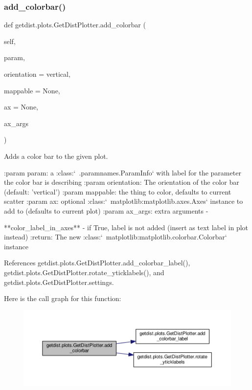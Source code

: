 \subsubsection{\texorpdfstring{add\+\_\+colorbar()}{add\_colorbar()}}
{\footnotesize\ttfamily def getdist.\+plots.\+Get\+Dist\+Plotter.\+add\+\_\+colorbar (\begin{DoxyParamCaption}\item[{}]{self,  }\item[{}]{param,  }\item[{}]{orientation = {\ttfamily \textquotesingle{}vertical\textquotesingle{}},  }\item[{}]{mappable = {\ttfamily None},  }\item[{}]{ax = {\ttfamily None},  }\item[{}]{ax\+\_\+args }\end{DoxyParamCaption})}

\begin{DoxyVerb}Adds a color bar to the given plot.

:param param: a :class:`~.paramnames.ParamInfo` with label for the parameter the color bar is describing
:param orientation: The orientation of the color bar (default: 'vertical')
:param mappable: the thing to color, defaults to current scatter
:param ax: optional :class:`~matplotlib:matplotlib.axes.Axes` instance to add to (defaults to current plot)
:param ax_args: extra arguments -

       **color_label_in_axes** - if True, label is not added (insert as text label in plot instead)
:return: The new :class:`~matplotlib:matplotlib.colorbar.Colorbar` instance
\end{DoxyVerb}
 

References getdist.\+plots.\+Get\+Dist\+Plotter.\+add\+\_\+colorbar\+\_\+label(), getdist.\+plots.\+Get\+Dist\+Plotter.\+rotate\+\_\+yticklabels(), and getdist.\+plots.\+Get\+Dist\+Plotter.\+settings.

Here is the call graph for this function\+:
\nopagebreak
\begin{figure}[H]
\begin{center}
\leavevmode
\includegraphics[width=350pt]{classgetdist_1_1plots_1_1GetDistPlotter_a624c60e696a6309dc60b7f67a168d65a_cgraph}
\end{center}
\end{figure}
\mbox{\label{classgetdist_1_1plots_1_1GetDistPlotter_ae418e1e11ac0e54cec213eb7b1e8cec9}} 
